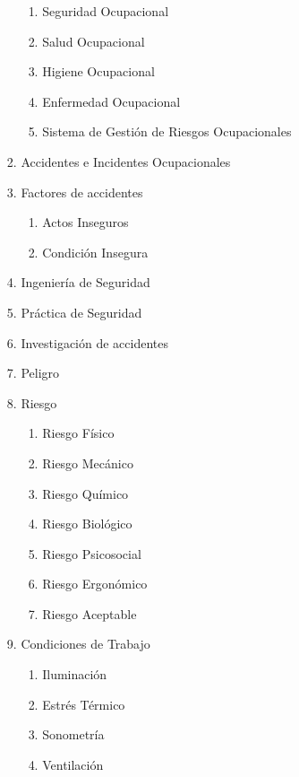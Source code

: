 \begin{enumerate}[label*=\arabic*.]
\begin{enumerate}[label*=\arabic*.]
\begin{enumerate}[label*=\arabic*.]
            \begin{enumerate}[label*=\arabic*.]
                \item Seguridad Ocupacional
                \item Salud Ocupacional
                \item Higiene Ocupacional
                \item Enfermedad Ocupacional
                \item Sistema de Gestión de Riesgos Ocupacionales
            \end{enumerate}
            \item Accidentes e Incidentes Ocupacionales
            \item Factores de accidentes
            \begin{enumerate}[label*=\arabic*.]
                \item Actos Inseguros
                \item Condición Insegura
            \end{enumerate}
            \item Ingeniería de Seguridad
            \item Práctica de Seguridad
            \item Investigación de accidentes
            \item Peligro
            \item Riesgo
            \begin{enumerate}[label*=\arabic*.]
                \item Riesgo Físico
                \item Riesgo Mecánico
                \item Riesgo Químico
                \item Riesgo Biológico
                \item Riesgo Psicosocial
                \item Riesgo Ergonómico
                \item Riesgo Aceptable
            \end{enumerate}
            \item Condiciones de Trabajo
            \begin{enumerate}[label*=\arabic*.]
                \item Iluminación
                \item Estrés Térmico
                \item Sonometría
                \item Ventilación

\end{enumerate}
\end{enumerate}
\end{enumerate}
\end{enumerate}
